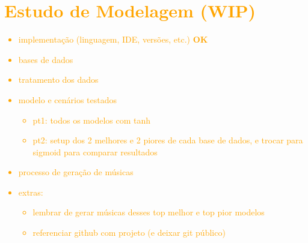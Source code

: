 \documentclass{automatextcc}
\newcommand{\nico}[1]{\textcolor{orange}{#1}}
\begin{document}
\chapter{\nico{Estudo de Modelagem (WIP)}}
\nico{
\begin{itemize}
    \item implementação (linguagem, IDE, versões, etc.) \textbf{OK}
    \item bases de dados
    \item tratamento dos dados
    \item modelo e cenários testados
    \begin{itemize}
        \item pt1: todos os modelos com tanh
        \item pt2: setup dos 2 melhores e 2 piores de cada base de dados, e trocar para sigmoid para comparar resultados
    \end{itemize}
    \item processo de geração de músicas
    \item extras:
    \begin{itemize}
        \item lembrar de gerar músicas desses top melhor e top pior modelos
        \item referenciar github com projeto (e deixar git público)
    \end{itemize}
\end{itemize}
}
\end{document}
